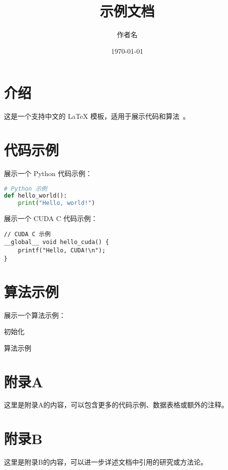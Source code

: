 \documentclass{ctexart}
\title{示例文档}
\author{作者名}
\date{\today}
\begin{document}
\maketitle

\section{介绍}
这是一个支持中文的 LaTeX 模板，适用于展示代码和算法~\cite{knuth1984texbook}。

\section{代码示例}
展示一个 Python 代码示例：

\begin{lstlisting}[language=Python, caption=Python 示例代码]
# Python 示例
def hello_world():
    print("Hello, world!")
\end{lstlisting}

展示一个 CUDA C 代码示例：

\begin{lstlisting}[style=cuda, caption=CUDA C 示例代码]
// CUDA C 示例
__global__ void hello_cuda() {
    printf("Hello, CUDA!\n");
}
\end{lstlisting}

\section{算法示例}
展示一个算法示例：

\begin{algorithm}[H]
\SetAlgoLined
{}
 初始化\;
 \caption{算法示例}
\end{algorithm}

\appendix
\section{附录A}
这里是附录A的内容，可以包含更多的代码示例、数据表格或额外的注释。

\section{附录B}
这里是附录B的内容，可以进一步详述文档中引用的研究或方法论。



\end{document}
